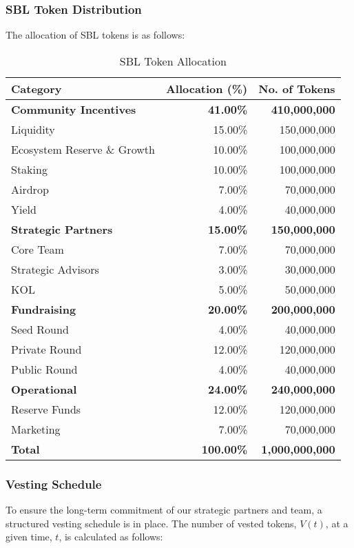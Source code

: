 \subsubsection{SBL Token Distribution}
The allocation of SBL tokens is as follows:

\begin{table}[h!]
\centering
\renewcommand{\arraystretch}{1.2}
\begin{tabular}{|l|r|r|}
\hline
\textbf{Category} & \textbf{Allocation (\%)} & \textbf{No. of Tokens} \\
\hline
\textbf{Community Incentives} & \textbf{41.00\%} & \textbf{410,000,000} \\
\hline
Liquidity & 15.00\% & 150,000,000 \\
Ecosystem Reserve \& Growth & 10.00\% & 100,000,000 \\
Staking & 10.00\% & 100,000,000 \\
Airdrop & 7.00\% & 70,000,000 \\
Yield & 4.00\% & 40,000,000 \\
\hline
\textbf{Strategic Partners} & \textbf{15.00\%} & \textbf{150,000,000} \\
\hline
Core Team & 7.00\% & 70,000,000 \\
Strategic Advisors & 3.00\% & 30,000,000 \\
KOL & 5.00\% & 50,000,000 \\
\hline
\textbf{Fundraising} & \textbf{20.00\%} & \textbf{200,000,000} \\
\hline
Seed Round & 4.00\% & 40,000,000 \\
Private Round & 12.00\% & 120,000,000 \\
Public Round & 4.00\% & 40,000,000 \\
\hline
\textbf{Operational} & \textbf{24.00\%} & \textbf{240,000,000} \\
\hline
Reserve Funds & 12.00\% & 120,000,000 \\
Marketing & 7.00\% & 70,000,000 \\
\hline
\textbf{Total} & \textbf{100.00\%} & \textbf{1,000,000,000} \\
\hline
\end{tabular}
\caption{SBL Token Allocation}
\label{tab:tokenallocation}
\end{table}


\subsubsection{Vesting Schedule}
To ensure the long-term commitment of our strategic partners and team, a structured vesting schedule is in place. The number of vested tokens, $V(t)$, at a given time, $t$, is calculated as follows:


